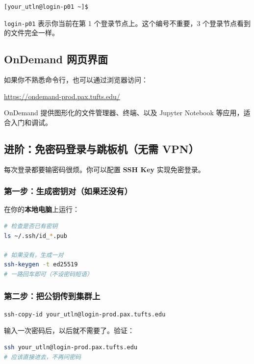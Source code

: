 \begin{lstlisting}
[your_utln@login-p01 ~]$
\end{lstlisting}

\texttt{login-p01} 表示你当前在第 1 个登录节点上。这个编号不重要，3 个登录节点看到的文件完全一样。

\subsection{OnDemand 网页界面}

如果你不熟悉命令行，也可以通过浏览器访问：

\begin{center}
\url{https://ondemand-prod.pax.tufts.edu/}
\end{center}

OnDemand 提供图形化的文件管理器、终端、以及 Jupyter Notebook 等应用，适合入门和调试。

\subsection{进阶：免密码登录与跳板机（无需 VPN）}

每次登录都要输密码很烦。你可以配置 \textbf{SSH Key} 实现免密登录。

\subsubsection{第一步：生成密钥对（如果还没有）}

在你的\textbf{本地电脑}上运行：

\begin{lstlisting}[language=bash]
# 检查是否已有密钥
ls ~/.ssh/id_*.pub

# 如果没有，生成一对
ssh-keygen -t ed25519
# 一路回车即可（不设密码短语）
\end{lstlisting}

\subsubsection{第二步：把公钥传到集群上}

\begin{lstlisting}[language=bash]
ssh-copy-id your_utln@login-prod.pax.tufts.edu
\end{lstlisting}

输入一次密码后，以后就不需要了。验证：

\begin{lstlisting}[language=bash]
ssh your_utln@login-prod.pax.tufts.edu
# 应该直接进去，不再问密码
\end{lstlisting}

